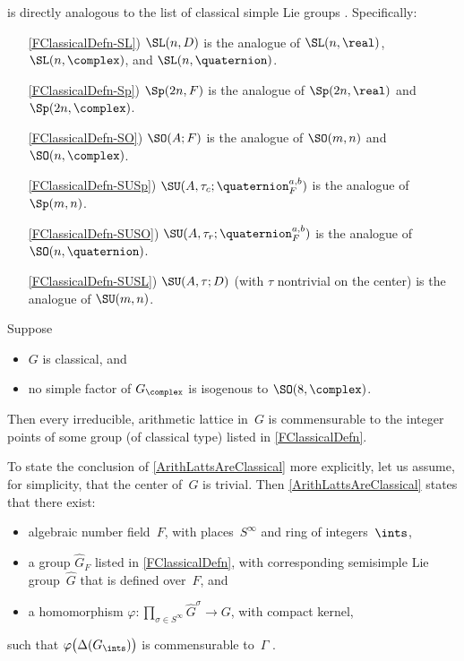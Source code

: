 \begin{rem}
  is directly analogous to
the list of classical simple Lie groups
.
Specifically:
 \begin{enumerate}
 \item[\ref{FClassicalDefn-SL})]
 $\SL(n,D)$ is the analogue of $\SL(n,\real)$,
$\SL(n,\complex)$, and $\SL(n,\quaternion)$.
 \item[\ref{FClassicalDefn-Sp})]
 $\Sp(2n,F)$ is the analogue of $\Sp(2n,\real)$ and
$\Sp(2n,\complex)$.
 \item[\ref{FClassicalDefn-SO})]
 $\SO(A;F)$ is the analogue of $\SO(m,n)$ and
$\SO(n,\complex)$.
 \item[\ref{FClassicalDefn-SUSp})]
 $\SU(A, \tau_c; \quaternion_F^{a,b})$ is the analogue of $\Sp(m,n)$.
 \item[\ref{FClassicalDefn-SUSO})]
 $\SU(A, \tau_r; \quaternion_F^{a,b})$ is the analogue of $\SO(n,\quaternion)$.
 \item[\ref{FClassicalDefn-SUSL})]
 $\SU(A,\tau;D)$ (with $\tau$ nontrivial on the center) is
the analogue of $\SU(m,n)$.
 \end{enumerate}
 \end{rem}


\begin{thm} \label{ArithLattsAreClassical}
Suppose 
\noprelistbreak
	\begin{itemize}
	\item $G$ is classical, 
	and 
	\item no simple factor of $G_\complex$ is isogenous to\/ $\SO(8,\complex)$.
	\end{itemize}
Then every irreducible, arithmetic lattice in~$G$ is commensurable to the integer points of some group\/ \textup(of classical type\/\textup) listed in \cref{FClassicalDefn}.
\end{thm}

\begin{rem}
To state the conclusion of \cref{ArithLattsAreClassical} more explicitly, let us assume, for simplicity, that the center of~$G$ is trivial. Then \cref{ArithLattsAreClassical} states that there exist:
	\begin{itemize}
	\item algebraic number field~$F$, with places~$S^\infty$ and ring of integers~$\ints$,
	\item a group $\widehat G_F$ listed in \cref{FClassicalDefn}, with corresponding semisimple Lie group~$\widehat G$ that is defined over~$F$,  
	and
	\item a homomorphism $\varphi \colon \prod_{\sigma \in S^\infty} \widehat G^\sigma \to G$, with compact kernel,
	\end{itemize}
such that $\varphi \bigl( \Delta(G_{\ints}) \bigr)$ is commensurable to~$\Gamma$ .
\end{rem}

